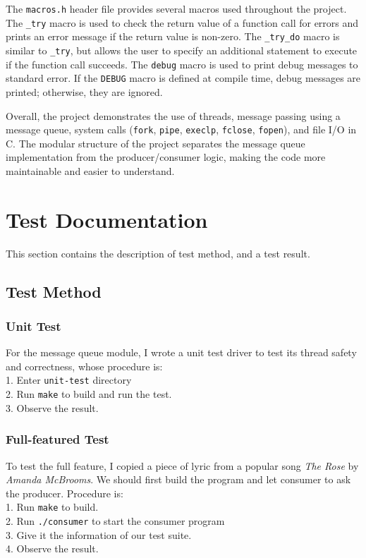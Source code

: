 \documentclass{article}
\begin{document}
The \texttt{macros.h} header file provides several macros used throughout the project. The \texttt{\_try} macro is used to check the return value of a function call for errors and prints an error message if the return value is non-zero. The \texttt{\_try\_do} macro is similar to \texttt{\_try}, but allows the user to specify an additional statement to execute if the function call succeeds. The \texttt{debug} macro is used to print debug messages to standard error. If the \texttt{DEBUG} macro is defined at compile time, debug messages are printed; otherwise, they are ignored.

Overall, the project demonstrates the use of threads, message passing using a message queue, system calls (\texttt{fork}, \texttt{pipe}, \texttt{execlp}, \texttt{fclose}, \texttt{fopen}), and file I/O in C. The modular structure of the project separates the message queue implementation from the producer/consumer logic, making the code more maintainable and easier to understand.

\section{Test Documentation}
This section contains the description of test method, and a test result.
\subsection{Test Method}
\subsubsection{Unit Test}
For the message queue module, I wrote a unit test driver to test its thread safety and correctness, whose procedure is: \\
1. Enter \texttt{unit-test} directory \\
2. Run \texttt{make} to build and run the test. \\
3. Observe the result. \\

\subsubsection{Full-featured Test}
To test the full feature, I copied a piece of lyric from a popular song \textit{The Rose} by \textit{Amanda McBrooms}. We should first build the program and let consumer to ask the producer. Procedure is: \\
1. Run \texttt{make} to build. \\
2. Run \texttt{./consumer} to start the consumer program \\
3. Give it the information of our test suite. \\
4. Observe the result. \\
\end{document}
